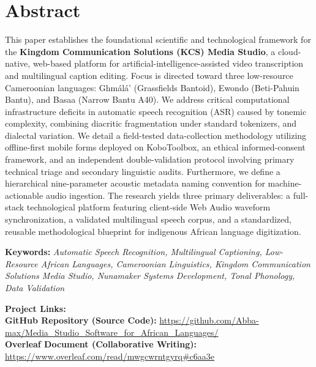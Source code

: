 \documentclass[a4paper,11pt]{article}
\author{IUSJ Engineering Group}
\begin{document}
\mytitle

\newpage

\section*{Abstract}
This paper establishes the foundational scientific and technological framework for the \textbf{Kingdom Communication Solutions (KCS) Media Studio}, a cloud-native, web-based platform for artificial-intelligence-assisted video transcription and multilingual caption editing. Focus is directed toward three low-resource Cameroonian languages: Gh\textopeno m\'al\'a' (Grassfields Bantoid), Ewondo (Beti-Pahuin Bantu), and Basaa (Narrow Bantu A40). We address critical computational infrastructure deficits in automatic speech recognition (ASR) caused by tonemic complexity, combining diacritic fragmentation under standard tokenizers, and dialectal variation. We detail a field-tested data-collection methodology utilizing offline-first mobile forms deployed on KoboToolbox, an ethical informed-consent framework, and an independent double-validation protocol involving primary technical triage and secondary linguistic audits. Furthermore, we define a hierarchical nine-parameter acoustic metadata naming convention for machine-actionable audio ingestion. The research yields three primary deliverables: a full-stack technological platform featuring client-side Web Audio waveform synchronization, a validated multilingual speech corpus, and a standardized, reusable methodological blueprint for indigenous African language digitization.

\vspace{1em}
\noindent\textbf{Keywords:} \textit{Automatic Speech Recognition, Multilingual Captioning, Low-Resource African Languages, Cameroonian Linguistics, Kingdom Communication Solutions Media Studio, Nunamaker Systems Development, Tonal Phonology, Data Validation}

\newpage

\frontmatter
\tableofcontents

\vspace{2em}
\noindent \textbf{Project Links:}\\
\textbf{GitHub Repository (Source Code):} \url{https://github.com/Abba-max/Media_Studio_Software_for_African_Languages/}\\
\textbf{Overleaf Document (Collaborative Writing):} \url{https://www.overleaf.com/read/mwgcwrntgyrq#c6aa3e}

\newpage
\end{document}
